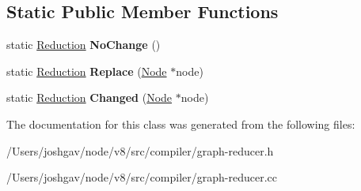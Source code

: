 \subsection*{Static Public Member Functions}
\begin{DoxyCompactItemize}
\item 
static \hyperlink{classv8_1_1internal_1_1compiler_1_1_reduction}{Reduction} {\bfseries No\+Change} ()\hypertarget{classv8_1_1internal_1_1compiler_1_1_reducer_af5fd251e94125282e7e21ad3280b407c}{}\label{classv8_1_1internal_1_1compiler_1_1_reducer_af5fd251e94125282e7e21ad3280b407c}

\item 
static \hyperlink{classv8_1_1internal_1_1compiler_1_1_reduction}{Reduction} {\bfseries Replace} (\hyperlink{classv8_1_1internal_1_1compiler_1_1_node}{Node} $\ast$node)\hypertarget{classv8_1_1internal_1_1compiler_1_1_reducer_a612beabd9842099138797d6b52f1941e}{}\label{classv8_1_1internal_1_1compiler_1_1_reducer_a612beabd9842099138797d6b52f1941e}

\item 
static \hyperlink{classv8_1_1internal_1_1compiler_1_1_reduction}{Reduction} {\bfseries Changed} (\hyperlink{classv8_1_1internal_1_1compiler_1_1_node}{Node} $\ast$node)\hypertarget{classv8_1_1internal_1_1compiler_1_1_reducer_a6309e9866a5be979111ffb8dc652a7af}{}\label{classv8_1_1internal_1_1compiler_1_1_reducer_a6309e9866a5be979111ffb8dc652a7af}

\end{DoxyCompactItemize}


The documentation for this class was generated from the following files\+:\begin{DoxyCompactItemize}
\item 
/\+Users/joshgav/node/v8/src/compiler/graph-\/reducer.\+h\item 
/\+Users/joshgav/node/v8/src/compiler/graph-\/reducer.\+cc\end{DoxyCompactItemize}

